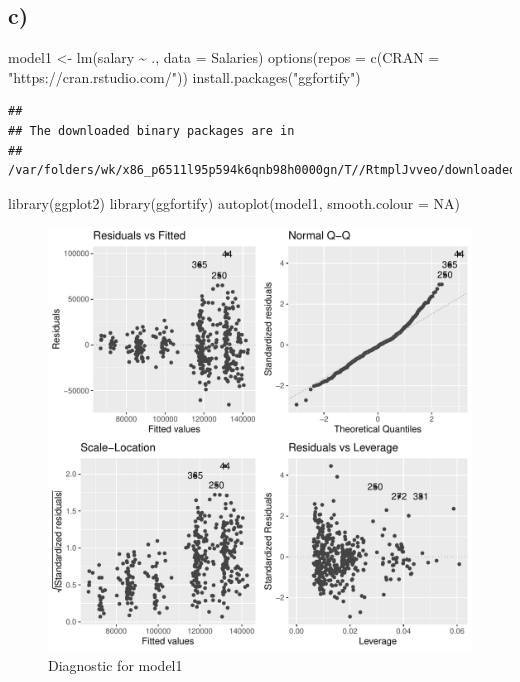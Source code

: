 \documentclass[
]{article}
\newenvironment{Shaded}{\begin{snugshade}}{\end{snugshade}}
\newcommand{\AttributeTok}[1]{\textcolor[rgb]{0.77,0.63,0.00}{#1}}
\newcommand{\ConstantTok}[1]{\textcolor[rgb]{0.00,0.00,0.00}{#1}}
\newcommand{\FunctionTok}[1]{\textcolor[rgb]{0.00,0.00,0.00}{#1}}
\newcommand{\NormalTok}[1]{#1}
\newcommand{\OtherTok}[1]{\textcolor[rgb]{0.56,0.35,0.01}{#1}}
\newcommand{\SpecialCharTok}[1]{\textcolor[rgb]{0.00,0.00,0.00}{#1}}
\newcommand{\StringTok}[1]{\textcolor[rgb]{0.31,0.60,0.02}{#1}}
\begin{document}
\hypertarget{c-1}{%
\subsection{c)}\label{c-1}}

\begin{Shaded}
\begin{Highlighting}[]
\NormalTok{model1 }\OtherTok{\textless{}{-}} \FunctionTok{lm}\NormalTok{(salary }\SpecialCharTok{\textasciitilde{}}\NormalTok{ ., }\AttributeTok{data =}\NormalTok{ Salaries)}
\FunctionTok{options}\NormalTok{(}\AttributeTok{repos =} \FunctionTok{c}\NormalTok{(}\AttributeTok{CRAN =} \StringTok{"https://cran.rstudio.com/"}\NormalTok{))}
\FunctionTok{install.packages}\NormalTok{(}\StringTok{"ggfortify"}\NormalTok{)}
\end{Highlighting}
\end{Shaded}

\begin{verbatim}
## 
## The downloaded binary packages are in
##  /var/folders/wk/x86_p6511l95p594k6qnb98h0000gn/T//RtmplJvveo/downloaded_packages
\end{verbatim}

\begin{Shaded}
\begin{Highlighting}[]
\FunctionTok{library}\NormalTok{(ggplot2)}
\FunctionTok{library}\NormalTok{(ggfortify)}
\FunctionTok{autoplot}\NormalTok{(model1, }\AttributeTok{smooth.colour =} \ConstantTok{NA}\NormalTok{)}
\end{Highlighting}
\end{Shaded}

\begin{figure}

{\centering \includegraphics[width=0.7\linewidth]{Exercise1_files/figure-latex/fig_model-1} 

}

\caption{Diagnostic for model1}\label{fig:fig_model}
\end{figure}
\end{document}
